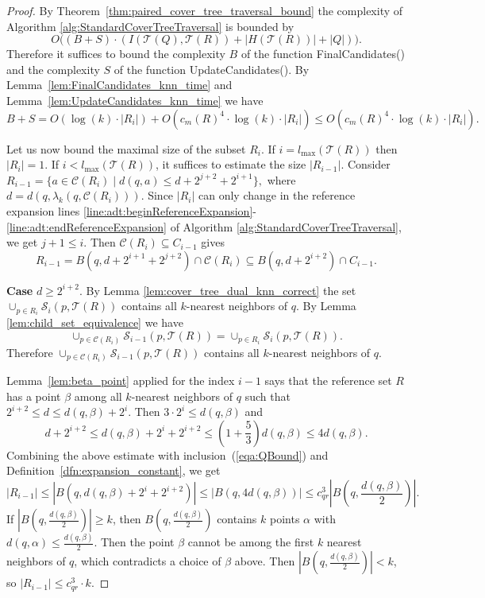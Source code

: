\documentclass[a4paper,UKenglish,cleveref, autoref]{lipics-v2019}
\numberwithin{algocf}{section}
\theoremstyle{definition}
\theoremstyle{definition}
\theoremstyle{definition}
\theoremstyle{plain}
\newcommand{\C}{\mathcal{C}}
\newcommand{\T}{\mathcal{T}}
\newcommand{\Sd}{\mathcal{S}}
\newcommand{\be}{\beta}
\begin{document}
\begin{proof}
By Theorem~\ref{thm:paired_cover_tree_traversal_bound} the complexity of Algorithm \ref{alg:StandardCoverTreeTraversal} is bounded by
\begin{equation}
\label{eqa:paired_tree_knn_time_B+S}
O\Big((B + S)\cdot(I(\T(Q), \T(R)) + |H(\T(R))| + |Q|)\Big).
\end{equation}
Therefore it suffices to bound the complexity $B$ of the function  FinalCandidates() and the complexity $S$ of the function UpdateCandidates(). 
By Lemma~\ref{lem:FinalCandidates_knn_time} and Lemma~\ref{lem:UpdateCandidates_knn_time} we have $$B + S =  O(\log(k) \cdot |R_{i}|) +  O( c_m(R)^4 \cdot \log(k) \cdot |R_{i}|)  \leq O(c_m(R)^4 \cdot \log(k) \cdot |R_{i}|).$$

Let us now bound the maximal size of the subset $R_{i}$. 
If $i = l_{\max}(\T(R))$ then $|R_i| = 1$. 
If $i < l_{\max}(\T(R))$, it suffices to estimate the size $|R_{i-1}|$.
Consider $R_{i-1} = \{a \in \C(R_i) \mid d(q, a) \leq d + 2^{j+2} + 2^{i+1}\},$ where $d = d(q,\lambda_k(q,\C(R_i)))$. 
Since $|R_i|$ can only change in the reference expansion lines \ref{line:adt:beginReferenceExpansion}-\ref{line:adt:endReferenceExpansion} of Algorithm \ref{alg:StandardCoverTreeTraversal}, we get $j + 1 \leq i$.  
Then $\C(R_{i}) \subseteq C_{i-1}$ gives
\begin{equation}
\label{eqa:QBound}
R_{i-1} = B(q, d+2^{i+1} + 2^{j+2}) \cap \C(R_i) \subseteq B(q, d+2^{i+2}) \cap C_{i-1}.
\end{equation}

\noindent
\textbf{Case} $d \geq 2^{i+2}$. 
By Lemma \ref{lem:cover_tree_dual_knn_correct} the set $\cup_{p \in R_i}\Sd_i(p, \T(R))$ contains all $k$-nearest neighbors of $q$.
By Lemma \ref{lem:child_set_equivalence} we have $$\cup_{p \in \C(R_i)}\Sd_{i-1}(p, \T(R)) = \cup_{p \in R_i}\Sd_{i}(p, \T(R)).$$ Therefore 
 $\cup_{p \in \C(R_i)}\Sd_{i-1}(p, \T(R))$ contains all $k$-nearest neighbors of $q$. 
\medskip
 
Lemma~\ref{lem:beta_point} applied for the index $i-1$ says that the reference set $R$ has a point $\beta$ among all $k$-nearest neighbors of $q$ such that $2^{i+2} \leq d \leq d(q,\beta) + 2^{i}$. 
Then $3\cdot2^{i} \leq d(q,\beta)$ and $$d + 2^{i+2} \leq d(q,\beta) + 2^{i} + 2^{i+2} \leq (1+\frac{5}{3})d(q,\beta) \leq 4d(q,\beta).$$
Combining the above estimate with inclusion~(\ref{eqa:QBound}) and Definition~\ref{dfn:expansion_constant}, we get
$$|R_{i-1}|  \leq |B(q,d(q,\beta) + 2^{i} + 2^{i+2})| \leq |B(q,4d(q,\beta))| \leq c_{qr}^3|B(q,\frac{d(q,\beta)}{2})|.$$
If $|B(q,\frac{d(q,\beta)}{2})| \geq k$, then $B(q,\frac{d(q,\beta)}{2})$ contains $k$ points $\alpha$ with $d(q,\alpha) \leq \frac{d(q,\beta)}{2}$. 
Then the point $\beta$ cannot be among the first $k$ nearest neighbors of $q$, which contradicts a choice of $\be$ above. 
Then $|B(q,\frac{d(q,\beta)}{2})| < k$, so $|R_{i-1}| \leq c_{qr}^3 \cdot k$. 
\medskip


\end{proof}
\end{document}
